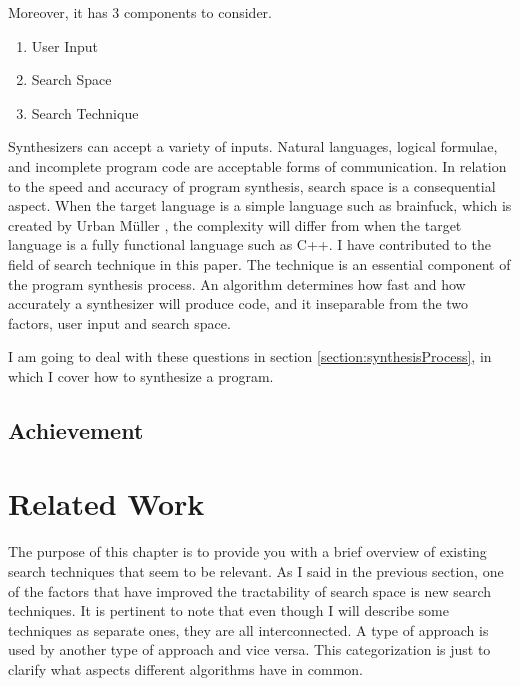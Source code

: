\documentclass[12pt, a4paper, titlepage]{report}
\begin{document}
    Moreover, it has 3 components to consider.
    \begin{enumerate}
      \item User Input
      \item Search Space
      \item Search Technique
    \end{enumerate}
    Synthesizers can accept a variety of inputs.
    Natural languages, logical formulae, and incomplete program code are acceptable forms of communication.
    In relation to the speed and accuracy of program synthesis, search space is a consequential aspect.
    When the target language is a simple language such as brainfuck, which is created by Urban Müller \cite{easter:2020}, the complexity will differ from when the target language is a fully functional language such as C++.
    I have contributed to the field of search technique in this paper.
    The technique is an essential component of the program synthesis process.
    An algorithm determines how fast and how accurately a synthesizer will produce code, and it inseparable from the two factors, user input and search space.

    I am going to deal with these questions in section \ref{section:synthesisProcess}, in which I cover how to synthesize a program.

  \section{Achievement} %

\chapter{Related Work}\label{chapter:relatedWork}
  The purpose of this chapter is to provide you with a brief overview of existing search techniques that seem to be relevant. As I said in the previous section, one of the factors that have improved the tractability of search space is new search techniques.
  It is pertinent to note that even though I will describe some techniques as separate ones, they are all interconnected. A type of approach is used by another type of approach and vice versa. This categorization is just to clarify what aspects different algorithms have in common.
\end{document}
